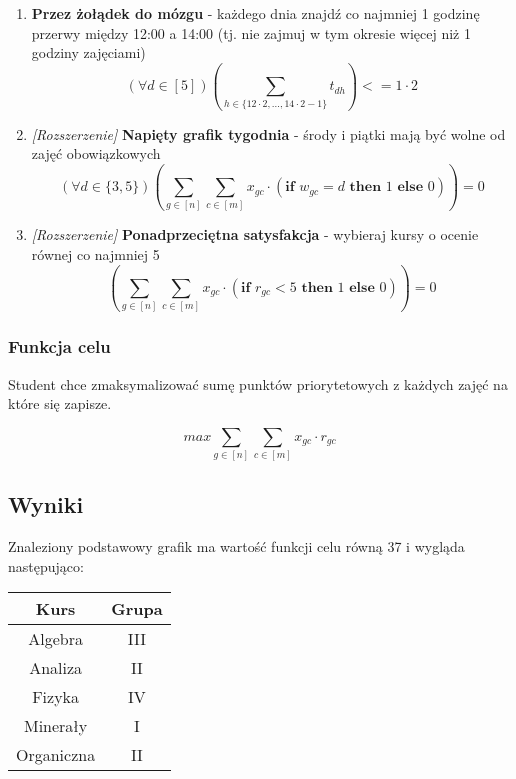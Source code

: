 \documentclass{article}
\theoremstyle{definition}
\theoremstyle{remark}
\theoremstyle{plain}
\theoremstyle{remark}
\theoremstyle{plain}
\begin{document}
\begin{enumerate}
    \item \textbf{Przez żołądek do mózgu} - każdego dnia znajdź co najmniej 1 godzinę przerwy między 12:00 a 14:00 (tj. nie zajmuj w tym okresie więcej niż 1 godziny zajęciami)
    \[ (\forall d \in [5]) \left(\sum_{h \in \{12\cdot 2,\ldots,14\cdot 2 - 1\}}{t_{dh}}\right) <= 1\cdot 2 \]

    \item \textit{[Rozszerzenie]} \textbf{Napięty grafik tygodnia} - środy i piątki mają być wolne od zajęć obowiązkowych
    \[ (\forall d \in \{3,5\}) \left(\sum_{g \in [n]}{\sum_{c \in [m]}{x_{gc}\cdot (\textbf{if } w_{gc} = d \textbf{ then } 1 \textbf{ else } 0)}} \right) = 0 \]

    \item \textit{[Rozszerzenie]} \textbf{Ponadprzeciętna satysfakcja} - wybieraj kursy o ocenie równej co najmniej 5
    \[ \left(\sum_{g \in [n]}{\sum_{c \in [m]}{x_{gc}\cdot (\textbf{if } r_{gc} < 5 \textbf{ then } 1 \textbf{ else } 0)}} \right) = 0 \]
\end{enumerate}

\subsubsection{Funkcja celu}
Student chce zmaksymalizować sumę punktów priorytetowych z każdych zajęć na które się zapisze.

\[ max {\sum_{g \in [n]}{\sum_{c \in [m]}{x_{gc}\cdot r_{gc}}}} \]

\subsection{Wyniki}
Znaleziony podstawowy grafik ma wartość funkcji celu równą 37 i wygląda następująco:
\begin{table}[H]
	\centering
	\begin{tabular}{|c|c|} \hline
		Kurs & Grupa \\\hline
        Algebra & III \\\hline
        Analiza & II \\\hline
        Fizyka & IV \\\hline
        Minerały & I \\\hline
        Organiczna & II \\\hline
	\end{tabular}
\end{table}
\end{document}
